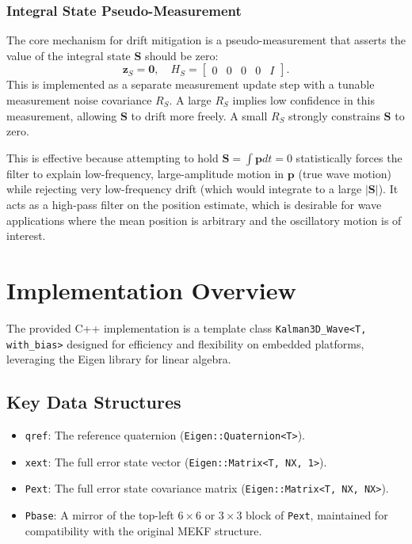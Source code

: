 \documentclass[11pt,letterpaper]{article}
\begin{document}
\subsubsection{Integral State Pseudo-Measurement}
\label{sssec:pseudomeas}
The core mechanism for drift mitigation is a pseudo-measurement that asserts the value of the integral state $\bm{S}$ should be zero:
\begin{equation}
\bm{z}_S = \bm{0}, \quad H_S = \begin{bmatrix} 0 & 0 & 0 & 0 & I \end{bmatrix}.
\end{equation}
This is implemented as a separate measurement update step with a tunable measurement noise covariance $R_S$. A large $R_S$ implies low confidence in this measurement, allowing $\bm{S}$ to drift more freely. A small $R_S$ strongly constrains $\bm{S}$ to zero.

This is effective because attempting to hold $\bm{S} = \int \bm{p}  dt = 0$ statistically forces the filter to explain low-frequency, large-amplitude motion in $\bm{p}$ (true wave motion) while rejecting very low-frequency drift (which would integrate to a large $|\bm{S}|$). It acts as a high-pass filter on the position estimate, which is desirable for wave applications where the mean position is arbitrary and the oscillatory motion is of interest.

\section{Implementation Overview}
\label{sec:implementation}

The provided C++ implementation is a template class \texttt{Kalman3D\_Wave<T, with\_bias>} designed for efficiency and flexibility on embedded platforms, leveraging the Eigen library for linear algebra.

\subsection{Key Data Structures}
\begin{itemize}
    \item \texttt{qref}: The reference quaternion (\texttt{Eigen::Quaternion<T>}).
    \item \texttt{xext}: The full error state vector (\texttt{Eigen::Matrix<T, NX, 1>}).
    \item \texttt{Pext}: The full error state covariance matrix (\texttt{Eigen::Matrix<T, NX, NX>}).
    \item \texttt{Pbase}: A mirror of the top-left $6\times6$ or $3\times3$ block of \texttt{Pext}, maintained for compatibility with the original MEKF structure.
\end{itemize}
\end{document}
